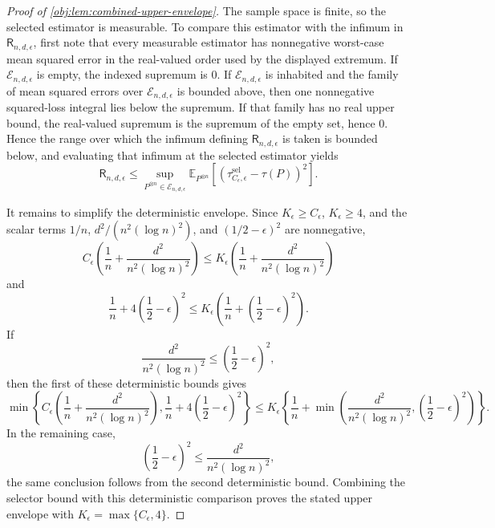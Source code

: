 \begin{proof}[Proof of \cref{obj:lem:combined-upper-envelope}]
The sample space is finite, so the selected estimator is measurable. To compare this estimator with the infimum in \(\mathsf R_{n,d,\epsilon}\), first note that every measurable estimator has nonnegative worst-case mean squared error in the real-valued order used by the displayed extremum. If \(\mathcal E_{n,d,\epsilon}\) is empty, the indexed supremum is \(0\). If \(\mathcal E_{n,d,\epsilon}\) is inhabited and the family of mean squared errors over \(\mathcal E_{n,d,\epsilon}\) is bounded above, then one nonnegative squared-loss integral lies below the supremum. If that family has no real upper bound, the real-valued supremum is the supremum of the empty set, hence \(0\). Hence the range over which the infimum defining \(\mathsf R_{n,d,\epsilon}\) is taken is bounded below, and evaluating that infimum at the selected estimator yields
\[
\mathsf R_{n,d,\epsilon}
\le
\sup_{P^{\otimes n}\in\mathcal E_{n,d,\epsilon}}
\mathbb E_{P^{\otimes n}}\!\left[
(\widehat\tau^{\mathrm{sel}}_{C_\epsilon,\epsilon}-\tau(P))^2
\right]. %
\]

It remains to simplify the deterministic envelope. Since \(K_\epsilon\ge C_\epsilon\), \(K_\epsilon\ge4\), and the scalar terms \(1/n\), \(d^2/(n^2(\log n)^2)\), and \((1/2-\epsilon)^2\) are nonnegative,
\[
C_\epsilon\left(\frac1n+\frac{d^2}{n^2(\log n)^2}\right)
\le
K_\epsilon\left(\frac1n+\frac{d^2}{n^2(\log n)^2}\right)
\]
and
\[
\frac1n+4\left(\frac12-\epsilon\right)^2
\le
K_\epsilon\left(\frac1n+\left(\frac12-\epsilon\right)^2\right).
\]
If
\[
\frac{d^2}{n^2(\log n)^2}\le \left(\frac12-\epsilon\right)^2,
\]
then the first of these deterministic bounds gives
\[
\min\!\left\{
C_\epsilon\left(\frac1n+\frac{d^2}{n^2(\log n)^2}\right),
\frac1n+4\left(\frac12-\epsilon\right)^2
\right\}
\le
K_\epsilon\left\{\frac1n+\min\!\left(\frac{d^2}{n^2(\log n)^2},\left(\frac12-\epsilon\right)^2\right)\right\}.
\]
In the remaining case,
\[
\left(\frac12-\epsilon\right)^2\le \frac{d^2}{n^2(\log n)^2},
\]
the same conclusion follows from the second deterministic bound. Combining the selector bound with this deterministic comparison proves the stated upper envelope with \(K_\epsilon=\max\{C_\epsilon,4\}\). %
\end{proof}
